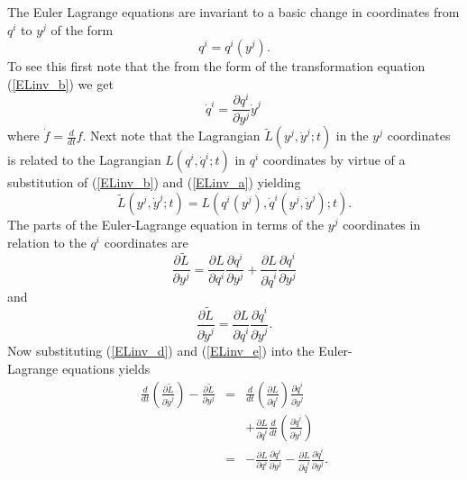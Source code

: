 \documentclass[12pt]{article}
\begin{document}
The Euler Lagrange equations are invariant to a basic change in coordinates from $q^i$ to
$y^j$ of the form 
\begin{equation}\label{ELinv_b}
  q^i = q^i(y^j) .
\end{equation}
To see this first note that the from the 
form of the transformation equation (\ref{ELinv_b}) we get
\begin{equation}\label{ELinv_a}
  {\dot q}^i = \frac{\partial q^i}{\partial y^j} {\dot y}^j \,
\end{equation}
where $\dot f = \frac{d}{dt} f$. Next note that the Lagrangian 
$\tilde L (y^j,{\dot y}^j;t )$ in the $y^j$ coordinates 
is related to the Lagrangian $L (q^i,{\dot q}^i;t )$ 
in $q^i$ coordinates by virtue of a substitution of (\ref{ELinv_b}) 
and (\ref{ELinv_a}) yielding
\begin{equation}\label{ELinv_c}
  \tilde L (y^j,{\dot y}^j;t ) = L (q^i(y^j),{\dot q}^i(y^j,{\dot y}^j);t ) .
\end{equation}
The parts of the Euler-Lagrange equation in terms
of the $y^j$ coordinates in relation to the $q^i$ coordinates are
\begin{equation}\label{ELinv_d}
  \frac{\partial \tilde L}{\partial y^j} =    \frac{\partial L}{\partial q^i}        \frac{\partial q^i}{\partial y^j} 
                                        +  \frac{\partial L}{\partial {\dot q}^i} \frac{\partial {\dot q}^i}{\partial y^j}
\end{equation}
and
\begin{equation}\label{ELinv_e}
  \frac{\partial \tilde L}{\partial {\dot y}^j} = \frac{\partial L}{\partial {\dot q}^i} \frac{\partial {\dot q}^i}{\partial {\dot y}^j} .
\end{equation}
Now substituting (\ref{ELinv_d}) and (\ref{ELinv_e}) into the Euler-\\Lagrange equations
yields
\begin{eqnarray}\label{ELinv_f}
  \frac{d}{dt} \left( \frac{\partial \tilde L}{\partial {\dot y}^j } \right) - \frac{\partial \tilde L}{\partial y^j} 
    & = &   \frac{d}{d t} \left( \frac{\partial L}{\partial {\dot q}^i} \right) \frac{\partial {\dot q}^i}{\partial {\dot y}^j} \\ \nonumber
	&   & + \frac{\partial L}{\partial {\dot q}^i} \frac{d}{dt} \left( \frac{\partial {\dot q}^i}{\partial {\dot y}^j} \right) \\ \nonumber
    & = & - \frac{\partial L}{\partial q^i}        \frac{\partial q^i}{\partial y^j} 
	      - \frac{\partial L}{\partial {\dot q}^i} \frac{\partial {\dot q}^i}{\partial y^j} .\nonumber
\end{eqnarray}
\end{document}
